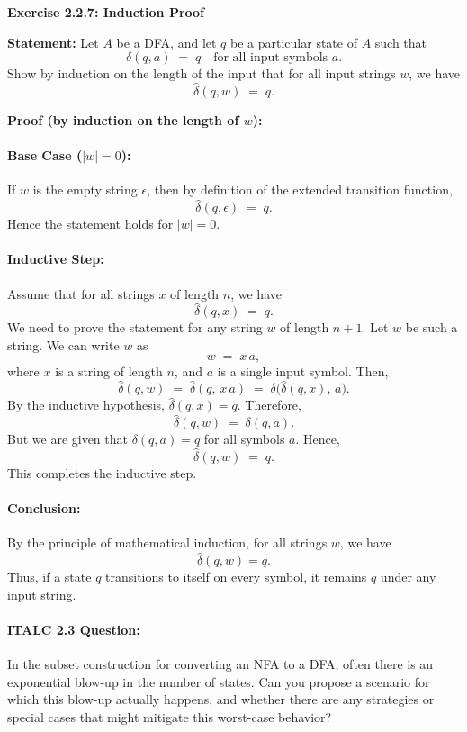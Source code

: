 \documentclass{article}
\theoremstyle{theorem}
\theoremstyle{definition}
\theoremstyle{remark}
\begin{document}
\textbf{Exercise 2.2.7: Induction Proof}

\noindent
\textbf{Statement:} Let $A$ be a DFA, and let $q$ be a particular state of $A$ such that
\[
\delta(q,a) \;=\; q
\quad
\text{for all input symbols } a.
\]
Show by induction on the length of the input that for all input strings $w$, we have
\[
\widehat{\delta}(q,w) \;=\; q.
\]

\bigskip

\noindent
\textbf{Proof (by induction on the length of $w$):}

\paragraph{Base Case ($|w| = 0$):}
If $w$ is the empty string $\epsilon$, then by definition of the extended transition function,
\[
\widehat{\delta}(q,\epsilon) \;=\; q.
\]
Hence the statement holds for $|w| = 0$.

\paragraph{Inductive Step:}
Assume that for all strings $x$ of length $n$, we have
\[
\widehat{\delta}(q,x) \;=\; q.
\]
We need to prove the statement for any string $w$ of length $n+1$. Let $w$ be such a string. We can write $w$ as
\[
w \;=\; x\,a,
\]
where $x$ is a string of length $n$, and $a$ is a single input symbol. Then,
\[
\widehat{\delta}(q,w)
\;=\;
\widehat{\delta}(q,\,x\,a)
\;=\;
\delta\bigl(\widehat{\delta}(q,x),\,a\bigr).
\]
By the inductive hypothesis, $\widehat{\delta}(q,x) = q$. Therefore,
\[
\widehat{\delta}(q,w)
\;=\;
\delta(q,a).
\]
But we are given that $\delta(q,a) = q$ for all symbols $a$. Hence,
\[
\widehat{\delta}(q,w)
\;=\;
q.
\]
This completes the inductive step.

\paragraph{Conclusion:}
By the principle of mathematical induction, for all strings $w$, we have
\[
\widehat{\delta}(q,w) = q.
\]
Thus, if a state $q$ transitions to itself on every symbol, it remains $q$ under any input string.
\paragraph{ITALC 2.3 Question:}
In the subset construction for converting an NFA to a DFA, often there is an exponential blow-up in the number of states. Can you propose a scenario for which this blow-up actually happens, and whether there are any strategies or special cases that might mitigate this worst-case behavior?
\end{document}
